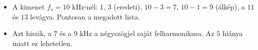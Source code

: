 \begin{center}\end{center}
\begin{eredmeny}

\begin{center}\end{center}
\end{eredmeny}
\begin{tipp}[Ellenőrzés]
\begin{itemize}
\item A kimenet $f_s=10$ kHz-nél: $1$, $3$ (eredeti), $10-3=7$, $10-1=9$ (álkép), a $11$ és $13$ levágva. Pontosan a megadott lista.
\end{itemize}
\end{tipp}
\begin{figyelem}
\begin{itemize}
\item Azt hiszik, a $7$ és a $9$ kHz a négyszögjel saját felharmonikusa. Az $5$ hiánya miatt ez lehetetlen.
\end{itemize}
\end{figyelem}
\begin{tipp}

\par{}\par
\end{tipp}


